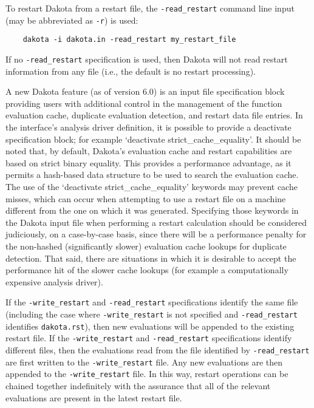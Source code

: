 To restart Dakota from a restart file, the \texttt{-read\_restart}
command line input (may be abbreviated as \texttt{-r}) is used:
\begin{small}
\begin{verbatim}
    dakota -i dakota.in -read_restart my_restart_file
\end{verbatim}
\end{small}

If no \texttt{-read\_restart} specification is used, then Dakota will
not read restart information from any file (i.e., the default is no
restart processing).

A new Dakota feature (as of version 6.0) is an input file specification block
providing users with additional control in the management of the function
evaluation cache, duplicate evaluation detection, and restart data file
entries.  In the interface’s analysis driver definition, it is possible to
provide a deactivate specification block; for example ‘deactivate
strict_cache_equality’.  It should be noted that, by default, Dakota's
evaluation cache and restart capabilities are based on strict binary equality.  
This provides a performance advantage, as it permits a hash-based data
structure to be used to search the evaluation cache.  The use of the
‘deactivate strict_cache_equality’ keywords may prevent cache misses, which can
occur when attempting to use a restart file on a machine different from the one 
on which it was generated.  Specifying those keywords in the Dakota input file 
when performing a restart calculation should be considered judiciously, on a
case-by-case basis, since there will be a performance penalty for the
non-hashed (significantly slower) evaluation cache lookups for duplicate
detection.  That said, there are situations in which it is desirable to accept
the performance hit of the slower cache lookups (for example a computationally
expensive analysis driver).

If the \texttt{-write\_restart} and \texttt{-read\_restart}
specifications identify the same file (including the case where
\texttt{-write\_restart} is not specified and \texttt{-read\_restart}
identifies \texttt{dakota.rst}), then new evaluations will be appended
to the existing restart file. If the \texttt{-write\_restart} and
\texttt{-read\_restart} specifications identify different files, then
the evaluations read from the file identified by
\texttt{-read\_restart} are first written to the
\texttt{-write\_restart} file. Any new evaluations are then appended
to the \texttt{-write\_restart} file. In this way, restart operations
can be chained together indefinitely with the assurance that all of
the relevant evaluations are present in the latest restart file.

